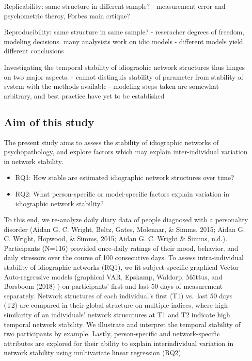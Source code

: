 \documentclass[
  english,
  man]{apa6}
\begin{document}
Replicability: same structure in different sample?
- measurement error and psychometric theroy, Forbes main crtique?

Reproducibility: same structure in same sample?
- reseracher degrees of freedom, modeling decisions.
many analysists work on idio models - different models yield different conclusions

Investigating the temporal stability of idiograohic network structures thus hinges on two major aspects: - cannot distinguis stability of parameter from stability of system with the methods available - modeling steps taken are somewhat arbitrary, and best practice have yet to be established

\hypertarget{aim-of-this-study}{%
\subsection{Aim of this study}\label{aim-of-this-study}}

The present study aims to assess the stability of idiographic networks of psychopathology, and explore factors which may explain inter-individual variation in network stability.

\begin{itemize}
\item
  RQ1: How stable are estimated idiographic network structures over time?
\item
  RQ2: What person-specific or model-specific factors explain variation in idiographic network stability?
\end{itemize}

To this end, we re-analyze daily diary data of people diagnosed with a personality disorder (Aidan G. C. Wright, Beltz, Gates, Molenaar, \& Simms, 2015; Aidan G. C. Wright, Hopwood, \& Simms, 2015; Aidan G. C. Wright \& Simms, n.d.).
Participants (N=116) provided once-daily ratings of their mood, behavior, and daily stressors over the course of 100 consecutive days.
To assess intra-individual stability of idiographic networks (RQ1), we fit subject-specific graphical Vector Auto-regressive models (graphical VAR, Epskamp, Waldorp, Mõttus, and Borsboom (2018) ) on participants' first and last 50 days of measurement separately.
Network structures of each individual's first (T1) vs.~last 50 days (T2) are compared in their global structure on multiple indices, where high similarity of an individuals' network strucutures at T1 and T2 indicate high temporal network stability.
We illustrate and interpret the temporal stability of two participants by example.
Lastly, person-specific and network-specific attributes are explored for their ability to explain interindividual variation in network stability using multivariate linear regression (RQ2).
\end{document}
